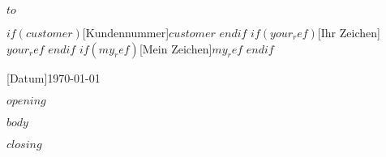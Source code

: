 \documentclass[briefvorlage,
   parskip=half,%
   fromfax=on,%
   fromemail=on,%
   locfield=wide,%
   draft=false%
]{scrlttr2}
\begin{document}
 \begin{letter}{
     $to$
 }  



$if(customer)$[\normalfont Kundennummer]{$customer$} $endif$
$if(your_ref)$[\normalfont Ihr Zeichen] {$your_ref$} $endif$
$if(my_ref)$[\normalfont Mein Zeichen]{$my_ref$} $endif$

[\normalfont Datum]{\today}
\opening{$opening$}

$body$

\closing{$closing$}
\end{letter}
 
\end{document}
